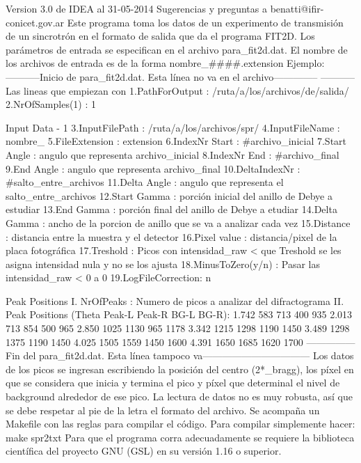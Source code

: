 Version 3.0 de IDEA al 31-05-2014
Sugerencias y preguntas a benatti@ifir-conicet.gov.ar
Este programa toma los datos de un experimento de transmisión de un sincrotrón en el formato de salida que da el programa FIT2D.
Los parámetros de entrada se especifican en el archivo para_fit2d.dat. El nombre de los archivos de entrada es de la forma nombre_####.extension
Ejemplo:
-----------Inicio de para_fit2d.dat. Esta línea no va en el archivo--------------
-----------Las lineas que empiezan con %
1.PathForOutput     : /ruta/a/los/archivos/de/salida/
2.NrOfSamples(1)    : 1

Input Data - 1
3.InputFilePath     : /ruta/a/los/archivos/spr/
4.InputFileName     : nombre_
5.FileExtension     : extension
6.IndexNr Start     : #archivo_inicial
7.Start Angle       : angulo que representa archivo_inicial
8.IndexNr End       : #archivo_final
9.End Angle         : angulo que representa archivo_final
10.DeltaIndexNr     : #salto_entre_archivos
11.Delta Angle      : angulo que representa el salto_entre_archivos
12.Start Gamma      : porción inicial del anillo de Debye a estudiar
13.End Gamma        : porción final del anillo de Debye a etudiar
14.Delta Gamma      : ancho de la porcion de anillo que se va a analizar cada vez
15.Distance         : distancia entre la muestra y el detector
16.Pixel value      : distancia/pixel de la placa fotográfica
17.Treshold         : Picos con intensidad_raw < que Treshold se les asigna intensidad nula y no se los ajusta
18.MinusToZero(y/n) : Pasar las intensidad_raw < 0 a 0 
19.LogFileCorrection: n

Peak Positions
I. NrOfPeaks        : Numero de picos a analizar del difractograma
II. Peak Positions
(Theta Peak-L Peak-R BG-L BG-R):
1.742 583 713 400 935
2.013 713 854 500 965
2.850 1025 1130 965 1178
3.342 1215 1298 1190 1450
3.489 1298 1375 1190 1450
4.025 1505 1559 1450 1600
4.391 1650 1685 1620 1700
---------------Fin del para_fit2d.dat. Esta línea tampoco va---------------------------------
Los datos de los picos se ingresan escribiendo la posición del centro (2*\theta_{bragg}), los píxel en que se considera que inicia y termina el pico y píxel que determinal el nivel de background alrededor de ese pico.
La lectura de datos no es muy robusta, así que se debe respetar al pie de la letra el formato del archivo.
Se acompaña un Makefile con las reglas para compilar el código. Para compilar simplemente hacer:
make spr2txt
Para que el programa corra adecuadamente se requiere la biblioteca científica del proyecto GNU (GSL) en su versión 1.16 o superior.

